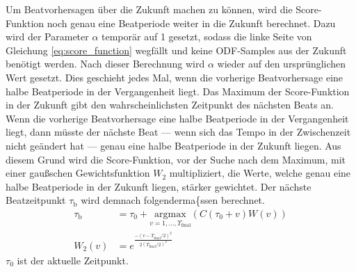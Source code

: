 {{{			%
			Um Beatvorhersagen über die Zukunft machen zu können,
				wird die Score-Funktion noch genau eine Beatperiode weiter in die Zukunft berechnet.
			Dazu wird der Parameter $\alpha$ temporär auf \num{1} gesetzt,
				sodass die linke Seite von Gleichung \eqref{eq:score_function} wegfällt
				und keine ODF-Samples aus der Zukunft benötigt werden.
			Nach dieser Berechnung wird $\alpha$ wieder auf den ursprünglichen Wert gesetzt.
			Dies geschieht jedes Mal,
				wenn die vorherige Beatvorhersage eine halbe Beatperiode in der Vergangenheit liegt.
			Das Maximum der Score-Funktion in der Zukunft gibt den wahrscheinlichsten Zeitpunkt des nächsten Beats an.
			Wenn die vorherige Beatvorhersage eine halbe Beatperiode in der Vergangenheit liegt,
				dann müsste der nächste Beat
				--- wenn sich das Tempo in der Zwischenzeit nicht geändert hat ---
				genau eine halbe Beatperiode in der Zukunft liegen.
			Aus diesem Grund wird die Score-Funktion,
				vor der Suche nach dem Maximum,
				mit einer gau{\ss}schen Gewichtsfunktion $W_2$ multipliziert,
				die Werte, welche genau eine halbe Beatperiode in der Zukunft liegen,
				stärker gewichtet.
			Der nächste Beatzeitpunkt $\tau_\text{b}$ wird demnach folgenderma\{ss}en berechnet.
			\begin{align}
				\tau_\text{b} &= \tau_0 + \underset{v = 1, ..., \Upsilon_\text{final}}{\text{argmax}}(C(\tau_0 + v)W(v)) \\
				W_2(v) &= e^{\frac{-(v - \Upsilon_\text{final} / 2)^2}{2(\Upsilon_\text{final} / 2)^2}}
			\end{align}
			$\tau_0$ ist der aktuelle Zeitpunkt.
		}
	}

